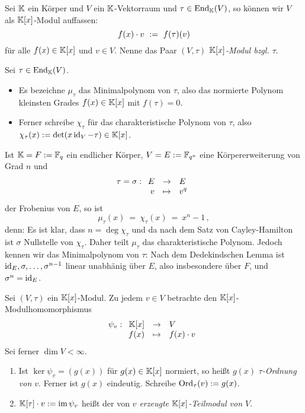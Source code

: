 \begin{definition}[$(V,\tau)$]
  Sei $\mathbb{K}$ ein Körper und $V$ ein $\mathbb{K}$-Vektorraum und 
  $\tau \in \operatorname{End}_\mathbb{K}(V)$, so können wir $V$ als $\mathbb{K}[x]$-Modul auffassen:
  \[ f(x) \cdot v \ :=\  f(\tau)(v)\]
  für alle $f(x) \in \mathbb{K}[x]$ und $v\in V$.
  Nenne das Paar $(V,\tau)$ \emph{$\mathbb{K}[x]$-Modul bzgl. $\tau$}.
\end{definition}

\begin{notation}
  Sei $\tau\in \operatorname{End}_\mathbb{K}(V)$.
  \begin{itemize}
  \item Es bezeichne $\mu_\tau$ das Minimalpolynom von 
    $\tau$, also das normierte Polynom kleinsten Grades $f(x)\in \mathbb{K}[x]$ mit 
    $f(\tau) = 0$.
  \item Ferner schreibe $\chi_\tau$ für das charakteristische Polynom von 
    $\tau$, also $\chi_\tau(x) := \det(x \operatorname{id}_V - \tau) \in \mathbb{K}[x]$.
  \end{itemize}
\end{notation}


\begin{bemerkung}
  Ist $\mathbb{K}  = F :=\mathbb{F}_q$ ein endlicher Körper, 
  $V = E := \mathbb{F}_{q^n}$ eine Körpererweiterung
  von Grad $n$ und 
  \[\tau = \sigma: \funcdef{E & \to & E\\
    v &\mapsto & v^q}\]
  der Frobenius von $E$, so ist
  \[ \mu_\tau(x) \ =\ \chi_\tau(x) \ =\ x^n - 1\,,\]
  denn: Es ist klar, dass $n = \deg \chi_\tau$ und da nach dem Satz von
  Cayley-Hamilton ist $\sigma$ Nullstelle von $\chi_\tau$. Daher teilt
  $\mu_\tau$ das charakteristische Polynom. Jedoch kennen wir das
  Minimalpolynom von $\tau$: Nach dem Dedekindschen Lemma
   ist 
  $\operatorname{id}_E,\sigma,\ldots,\sigma^{n-1}$ linear unabhänig über $E$, also insbesondere
  über $F$, und $\sigma^n = \operatorname{id}_E$.
\end{bemerkung}


\begin{definition}
  Sei $(V,\tau)$ ein $\mathbb{K}[x]$-Modul. Zu jedem $v \in V$ betrachte den
  $\mathbb{K}[x]$-Modulhomomorphismus
  \[ \psi_v: \funcdef{\K[x] & \to & V \\
    f(x) & \mapsto & f(x)\cdot v }  \]
  Sei ferner $\dim V < \infty$.
  \begin{enumerate}
    \item Ist $\ker\psi_v = (g(x))$ für $g(x)\in \mathbb{K}[x]$ normiert, so heißt
      $g(x)$ \emph{$\tau$-Ordnung von $v$}\@. Ferner ist $g(x)$ eindeutig.
      Schreibe $\operatorname{Ord}_\tau(v) := g(x)$.
    \item $\mathbb{K}[\tau]\cdot v := \operatorname{im}{\psi_v}$ heißt der von \emph{$v$ erzeugte
      $\mathbb{K}[x]$-Teilmodul von $V$}.
  \end{enumerate}
\end{definition}

